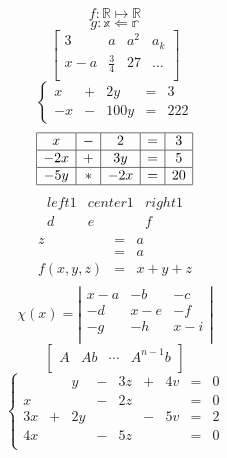 \documentclass[11pt,a4paper,nottitlepage,]{article}
\begin{document}
$$f:\mathbb{R} \mapsto \mathbb{R}$$
$$g:\mathbb{x} \Leftarrow \mathbb{r}$$
$$ \left[
\begin{array}{cccc} 
3 & a & a^2 & a_k \\
x-a & \frac{3}{4} & 27 & \ldots \\
\end{array} \right]
$$
$$ \left\{
\begin{array}{rcrcr}
x & + & 2y & = &3 \\
-x & - & 100y & = & 222
\end{array}
\right.
$$
$$
\begin{array}{|c|c|c|c|c|} \hline
x & - & 2 & = & 3 \\\hline
-2x & + & 3y & = & 5\\\hline
-5y & * & -2x & = & 20 \\\hline
\end{array} 
$$
$$
\begin{array}{|l|cr}
left1 & center1 & right1 \\\hline
d & e & f \\
\end{array}
$$
$$
\begin{array}{cll}
z & = & a \\
  & = & a\\
 f(x,y,z) & = & x+y+z \\
\end{array}
$$
$$
\chi (x) =
\left|
\begin{array}{ccc}
x-a & -b & -c \\
-d & x-e & -f \\
-g & -h & x-i \\
\end{array} \right|
$$
$$
\left[
\begin{array}{c|c|c|c}
A & Ab & \cdots & A^{n-1}b \\
\end{array}
\right]
$$
$$
\left\{
\begin{array}{rcrcrcrcr}
&  & y & - & 3z & +& 4v&= & 0 \\
x&  &  & - & 2z & &&= & 0 \\
3x& + & 2y &  &  & - & 5v&= & 2 \\
4x&  &  & - & 5z & &&= & 0 \\
\end{array}
\right.
$$
\end{document}
